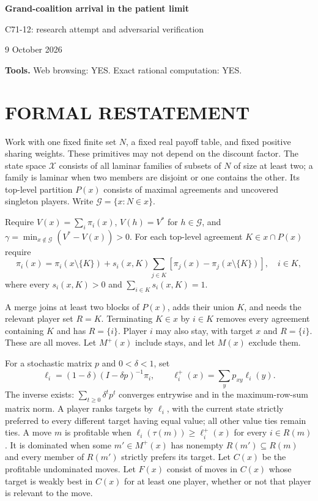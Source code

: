\documentclass[11pt,a4paper]{article}
\theoremstyle{definition}\newtheorem{definition}[theorem]{Definition}
\theoremstyle{remark}\newtheorem{remark}[theorem]{Remark}
\newcommand{\1}{\mathbf 1}
\begin{document}
\begin{center}
{\Large\bfseries Grand-coalition arrival in the patient limit}\par
\medskip
{\large C71-12: research attempt and adversarial verification}\par
9 October 2026
\end{center}
\textbf{Tools.} Web browsing: YES. Exact rational computation: YES.\par
\section{FORMAL RESTATEMENT}
Work with one fixed finite set $N$, a fixed real payoff table, and fixed positive sharing weights. These primitives may not depend on the discount factor. The state space $\mathcal X$ consists of all laminar families of subsets of $N$ of size at least two; a family is laminar when two members are disjoint or one contains the other. Its top-level partition $P(x)$ consists of maximal agreements and uncovered singleton players. Write $\mathcal G=\{x:N\in x\}$.

Require $V(x)=\sum_i\pi_i(x)$, $V(h)=V^*$ for $h\in\mathcal G$, and
$\gamma=\min_{x\notin\mathcal G}(V^*-V(x))>0$. For each top-level agreement $K\in x\cap P(x)$ require
\[
 \pi_i(x)=\pi_i(x\setminus\{K\})+s_i(x,K)
 \sum_{j\in K}[\pi_j(x)-\pi_j(x\setminus\{K\})],\quad i\in K,
\]
where every $s_i(x,K)>0$ and $\sum_{i\in K}s_i(x,K)=1$.

A merge joins at least two blocks of $P(x)$, adds their union $K$, and needs the relevant player set $R=K$. Terminating $K\in x$ by $i\in K$ removes every agreement containing $K$ and has $R=\{i\}$. Player $i$ may also stay, with target $x$ and $R=\{i\}$. These are all moves. Let $M^+(x)$ include stays, and let $M(x)$ exclude them.

For a stochastic matrix $p$ and $0<\delta<1$, set
\[
 \ell_i=(1-\delta)(I-\delta p)^{-1}\pi_i,
 \qquad \ell_i^+(x)=\sum_y p_{xy}\ell_i(y).
\]
The inverse exists: $\sum_{t\ge0}\delta^tp^t$ converges entrywise and in the maximum-row-sum matrix norm. A player ranks targets by $\ell_i$, with the current state strictly preferred to every different target having equal value; all other value ties remain ties. A move $m$ is profitable when
$\ell_i(\tau(m))\ge\ell_i^+(x)$ for every $i\in R(m)$. It is dominated when some $m'\in M^+(x)$ has nonempty $R(m')\subseteq R(m)$ and every member of $R(m')$ strictly prefers its target. Let $C(x)$ be the profitable undominated moves. Let $F(x)$ consist of moves in $C(x)$ whose target is weakly best in $C(x)$ for at least one player, whether or not that player is relevant to the move.
\end{document}
